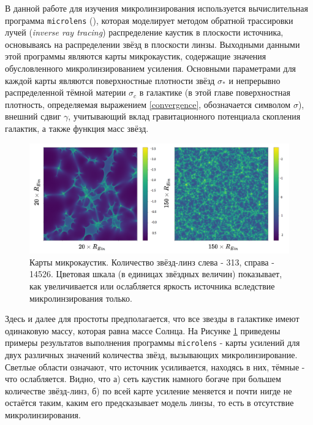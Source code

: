 В данной работе для изучения микролинзирования используется вычислительная программа {\tt{microlens}} (\cite{wambsganss1999}), которая моделирует методом обратной трассировки лучей (\textit{inverse ray tracing}) распределение каустик в плоскости источника, основываясь на распределении звёзд в плоскости линзы. Выходными данными этой программы являются карты микрокаустик, содержащие значения обусловленного микролинзированием усиления. Основными параметрами для каждой карты являются поверхностные плотности звёзд $\sigma_*$ и непрерывно распределенной тёмной материи $\sigma_c$ в галактике (в этой главе поверхностная плотность, определяемая выражением \eqref{convergence}, обозначается символом $\sigma$), внешний сдвиг $\gamma$, учитывающий вклад гравитационного потенциала скопления галактик, а также функция масс звёзд. 

\begin{figure}[H]
    \centering
	\includegraphics[scale=0.22]{pics/maps_example.png}
	\caption{Карты микрокаустик. Количество звёзд-линз слева - 313, справа - 14526. Цветовая шкала (в единицах звёздных величин) показывает, как увеличивается или ослабляется яркость источника вследствие микролинзирования только. \label{fig:micromaps}} 
\end{figure}
Здесь и далее для простоты предполагается, что все звезды в галактике имеют одинаковую массу, которая равна массе Солнца. На Рисунке \ref{fig:micromaps} приведены примеры результатов выполнения программы {\tt{microlens}} - карты усилений для двух различных значений количества звёзд, вызывающих микролинзирование. Светлые области означают, что источник усиливается, находясь в них, тёмные - что ослабляется. Видно, что а) сеть каустик намного богаче при большем количестве звёзд-линз, б) по всей карте усиление меняется и почти нигде не остаётся таким, каким его предсказывает модель линзы, то есть в отсутствие микролинзирования.